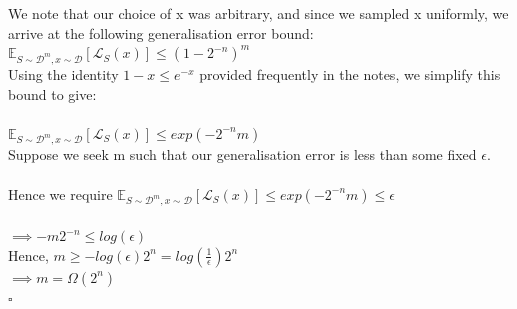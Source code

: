 \documentclass[12pt]{article}
\begin{document}
\begin{itemize}
    We note that our choice of x was arbitrary, and since we sampled x uniformly, we arrive at the 
    following generalisation error bound:\\

    $\mathbb{E}_{S \sim \mathcal{D}^{m}, x \sim \mathcal{D}}[\mathcal{L}_{S}(x)] \le (1 - 2^{-n})^{m} $\\
    Using the identity $1-x \le e^{-x}$ provided frequently in the notes, we simplify this bound to give:
    \\
    \\

    $\mathbb{E}_{S \sim \mathcal{D}^{m}, x \sim \mathcal{D}}[\mathcal{L}_{S}(x)] \le exp(-2^{-n}m)$\\
    Suppose we seek m such that our generalisation error is less than some fixed $\epsilon$. \\
    \\
    Hence we require $\mathbb{E}_{S \sim \mathcal{D}^{m}, x \sim \mathcal{D}}[\mathcal{L}_{S}(x)] \le exp(-2^{-n}m) \le \epsilon$\\
    \\
    $\implies -m2^{-n} \le log(\epsilon)$\\

    Hence, $m \ge -log(\epsilon)2^{n} = log(\frac{1}{\epsilon}) 2^{n}$\\

    $\implies m = \Omega(2^{n})$\\
    $\square$
\end{itemize}
\end{document}
